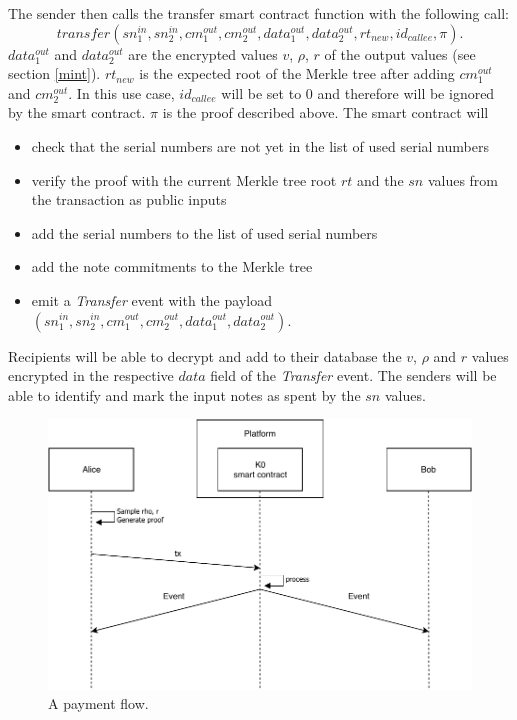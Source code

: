 \documentclass{article}
\begin{document}
The sender then calls the transfer smart contract function with the following call: $$transfer(sn_1^{in}, sn_2^{in}, cm_1^{out}, cm_2^{out}, data_1^{out}, data_2^{out}, rt_{new}, id_{callee}, \pi).$$ $data_1^{out}$ and $data_2^{out}$ are the encrypted values $v$, $\rho$, $r$ of the output values (see section \ref{mint}). $rt_{new}$ is the expected root of the Merkle tree after adding $cm_1^{out}$ and $cm_2^{out}$. In this use case, $id_{callee}$ will be set to 0 and therefore will be ignored by the smart contract. $\pi$ is the proof described above. The smart contract will
\begin{itemize}
    \item check that the serial numbers are not yet in the list of used serial numbers
    \item verify the proof with the current Merkle tree root $rt$ and the $sn$ values from the transaction as public inputs
    \item add the serial numbers to the list of used serial numbers
    \item add the note commitments to the Merkle tree
    \item emit a \textit{Transfer} event with the payload $(sn_1^{in}, sn_2^{in}, cm_1^{out}, cm_2^{out}, data_1^{out}, data_2^{out})$.
\end{itemize}
Recipients will be able to decrypt and add to their database the $v$, $\rho$ and $r$ values encrypted in the respective $data$ field of the \textit{Transfer} event. The senders will be able to identify and mark the input notes as spent by the $sn$ values.
\begin{figure}
\centering
\includegraphics[width=\columnwidth]{payment.pdf}
\caption{A payment flow.}
\end{figure}
\end{document}
